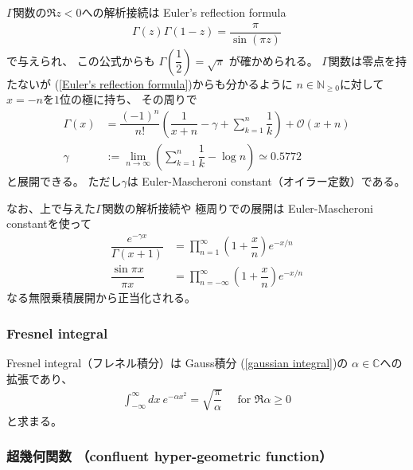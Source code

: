 $\Gamma$関数の$\Re z < 0$への解析接続は
Euler's reflection formula
\begin{align}
    \Gamma(z) \Gamma(1-z)
    =
    \dfrac{\pi}{\sin(\pi z)}
\label{Euler's reflection formula}
\end{align}
で与えられ、
この公式からも
$\Gamma \left(\dfrac{1}{2}\right) = \sqrt{\pi}$
が確かめられる。
$\Gamma$関数は零点を持たないが
(\ref{Euler's reflection formula})からも分かるように
$n \in \mathbb{N}_{\ge0}$に対して
$x = - n$を$1$位の極に持ち、
その周りで
\begin{align}
    \Gamma(x)
    &=
    \dfrac{(-1)^n}{n!}
    \left(
        \dfrac{1}{x+n} - \gamma
        + \sum_{k=1}^n \dfrac{1}{k}
    \right)
    + \mathcal{O}(x+n)
\\
    \gamma
    &:=
    \lim_{n\to\infty}
    \left(
        \sum_{k=1}^n \dfrac{1}{k} 
        -
        \log n
    \right)
    \simeq 0.5772
\end{align}
と展開できる。
ただし$\gamma$は
Euler-Mascheroni constant（オイラー定数）である。

なお、上で与えた$\Gamma$関数の解析接続や
極周りでの展開は
Euler-Mascheroni constantを使って
\begin{subequations}
\begin{align}
    \dfrac{
        e^{- \gamma x}
    }{
        \Gamma(x+1)
    }
    &=
    \prod_{n=1}^\infty
    \left(
        1 + \dfrac{x}{n}
    \right)
    e^{- x / n}
\\
    \dfrac{\sin \pi x}{\pi x}
    &=
    \prod_{n = - \infty}^\infty
    \left(
        1 + \dfrac{x}{n}
    \right)
    e^{- x / n}
\end{align}
\end{subequations}
なる無限乗積展開から正当化される。

\subsubsection{Fresnel integral}

Fresnel integral（フレネル積分）は
Gauss積分
(\ref{gaussian integral})の
$\alpha \in \mathbb{C}$への拡張であり、
\begin{align}
    \int_{-\infty}^{\infty}
    dx\ e^{- \alpha x^2}
    =
    \sqrt{
        \dfrac{\pi}{\alpha}
    }
    \quad
    \text{ for $\Re \alpha \ge 0$}
\label{fresnel integral}
\end{align}
と求まる。

\subsubsection{
    超幾何関数
    （confluent hyper-geometric function）
}

